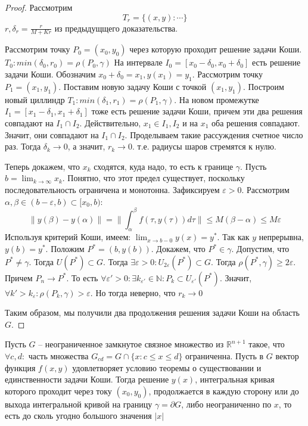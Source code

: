 \documentclass[document.tex]{subfiles}
\begin{document}
\begin{proof}
	Рассмотрим
	$$T_r = \{(x, y): \cdots \}$$
	$r, \delta_r = \frac{r}{M + Kr}$ из предыдущщего доказательства.

	Рассмотрим точку $P_0 = (x_0, y_0)$ через которую проходит решение задачи Коши. $T_0 : min(\delta_0, r_0) = \rho(P_0, \gamma)$
	На интервале $I_0 = [x_0 - \delta_0, x_0 + \delta_0]$ есть решение задачи Коши. Обозначим $x_0 + \delta_0 = x_1, y(x_1) = y_1$. Рассмотрим точку $P_1 = (x_1, y_1)$. Поставим  новую задачу Коши с точкой $(x_1, y_1)$. Построим новый циллиндр $T_1 : min(\delta_1, r_1) = \rho(P_1, \gamma)$. На новом промежутке $I_1 = [x_1 - \delta_1, x_1 + \delta_1]$ тоже есть решение задачи Коши, причем эти два решения совпадают на $I_1 \cap I_2$. Действительно, $x_1 \in I_1, I_2$ и на $x_1$ оба решения совпадают. Значит, они совпадают на $I_1 \cap I_2$. Проделываем такие рассуждения счетное число раз. Тогда $\delta_k \rightarrow 0$, а значит, $r_k \rightarrow 0$. т.е. радиусы шаров стремятся к нулю.

	Теперь докажем, что $x_k$ сходятся, куда надо, то есть к границе $\gamma$. Пусть $b = \lim_{k \rightarrow \infty} x_k$. Понятно, что этот предел существует, поскольку последовательность ограничена и монотонна. Зафиксируем $\varepsilon > 0$. Рассмотрим $\alpha, \beta \in (b - \varepsilon, b) \subset [x_0, b)$:
	$$\|y(\beta) - y(\alpha)\| = \|\int_{\alpha}^{\beta}f(\tau, y(\tau)) d\tau \| \leq M(\beta - \alpha) \leq M \varepsilon$$
	Используя критерий Коши, имеем: $\lim_{x \rightarrow b - 0} y(x) = y^*$. Так как $y$ непрерывна, $y(b) = y^*$. Положим $P^* = (b, y(b))$. Докажем, что $P^* \in \gamma$. Допустим, что $P^* \neq \gamma$. Тогда $U(P^*) \subset G$. Тогда $\exists \varepsilon > 0: U_{2 \varepsilon}(P^*) \subset G$. Тогда $\rho(P^*, \gamma) \geq 2 \varepsilon$. Причем $P_n \rightarrow P^*$. То есть $\forall \varepsilon' > 0 : \exists k_{\varepsilon'} \in \mathbb{N}: P_k \subset U_{\varepsilon'}(P^*)$. Значит, $\forall k' > k_{\varepsilon}: \rho(P_k, \gamma) > \varepsilon$. Но тогда неверно, что $r_k \rightarrow 0$

	Таким образом, мы получили два продолжения решения задачи Коши на область $G$.
\end{proof}

\begin{corollary}
	Пусть $G$ -- неограниченное замкнутое связное множество из $\mathbb{R}^{n+1}$ такое, что $\forall c, d:$ часть множества $G_{cd} = G \cap \{x : c \leq x \leq d\}$ ограниченна. Пусть в $G$ вектор функция $f(x, y)$ удовлетворяет условию теоремы о существовании и единственности задачи Коши. Тогда решение $y(x)$, интегральная кривая которого проходит через току $(x_0, y_0)$, продолжается в каждую сторону или до выхода интегральной кривой на границу $\gamma = \partial G$, либо неограниченно по $x$, то есть до сколь угодно большого значения $|x|$
\end{corollary}
\end{document}
